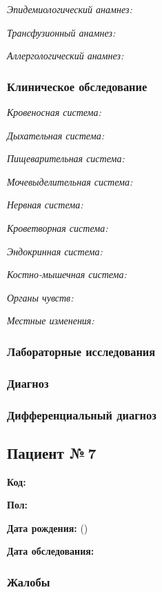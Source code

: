 \documentclass[a4paper,14pt]{extarticle}
\begin{document}
\emph{Эпидемиологический анамнез:}

\emph{Трансфузионный анамнез:}

\emph{Аллергологический анамнез:}

\subsubsection*{Клиническое обследование}

\emph{Кровеносная система:}

\emph{Дыхательная система:}

\emph{Пищеварительная система:}

\emph{Мочевыделительная система:}

\emph{Нервная система:} 

\emph{Кроветворная система:}

\emph{Эндокринная система:}

\emph{Костно-мышечная система:}

\emph{Органы чувств:}

\emph{Местные изменения:}

\subsubsection*{Лабораторные исследования}

\subsubsection*{Диагноз}

\subsubsection*{Дифференциальный диагноз}

\newpage
\subsection*{Пациент №\,7}

\textbf{Код:} 

\textbf{Пол:}

\textbf{Дата рождения:}  ()

\textbf{Дата обследования:} 

\subsubsection*{Жалобы}
\end{document}
